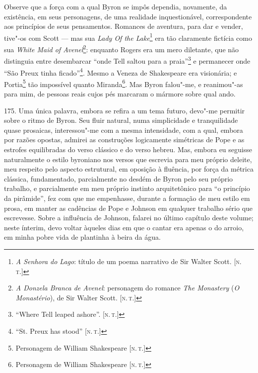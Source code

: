 Observe que a força com a qual Byron se impôs dependia, novamente, da
existência, em seus personagens, de uma realidade inquestionável,
correspondente aos princípios de seus pensamentos. Romances de aventura,
para dar e vender, tive"-os com Scott --- mas sua \emph{Lady Of the
Lake}\footnote{\emph{A Senhora do Lago}: título de um poema narrativo de
  Sir Walter Scott. {[}\textsc{n.\,t.}{]}} era tão claramente fictícia como sua
\emph{White Maid of Avenel}\footnote{\emph{A Donzela Branca de Avenel}:
  personagem do romance \emph{The Monastery} (\emph{O Monastério}), de
  Sir Walter Scott. {[}\textsc{n.\,t.}{]}}: enquanto Rogers era um mero
diletante, que não distinguia entre desembarcar ``onde Tell saltou para
a praia''\footnote{``Where Tell leaped ashore''. {[}\textsc{n.\,t.}{]}} e
permanecer onde ``São Preux tinha ficado''\footnote{``St. Preux has
  stood'' {[}\textsc{n.\,t.}{]}}. Mesmo a Veneza de Shakespeare era visionária;
e Portia\footnote{Personagem de William Shakespeare {[}\textsc{n.\,t.}{]}} tão
impossível quanto Miranda\footnote{Personagem de William Shakespeare
  {[}\textsc{n.\,t.}{]}}. Mas Byron falou"-me, e reanimou"-as para mim, de
pessoas reais cujos pés marcaram o mármore sobre qual ando.

175. Uma única palavra, embora se refira a um tema futuro, devo"-me
permitir sobre o ritmo de Byron. Seu fluir natural, numa simplicidade e
tranquilidade quase prosaicas, interessou"-me com a mesma intensidade,
com a qual, embora por razões opostas, admirei as construções
logicamente simétricas de Pope e as estrofes equilibradas do verso
clássico e do verso hebreu. Mas, embora eu seguisse naturalmente o
estilo byroniano nos versos que escrevia para meu próprio deleite, meu
respeito pelo aspecto estrutural, em oposição à fluência, por força da
métrica clássica, fundamentado, parcialmente no desdém de Byron pelo seu
próprio trabalho, e parcialmente em meu próprio instinto arquitetônico
para ``o princípio da pirâmide'', fez com que me empenhasse, durante a
formação de meu estilo em prosa, em manter as cadências de Pope e
Johnson em qualquer trabalho sério que escrevesse. Sobre a influência de
Johnson, falarei no último capítulo deste volume; neste ínterim, devo
voltar àqueles dias em que o cantar era apenas o do arroio, em minha
pobre vida de plantinha à beira da água.

